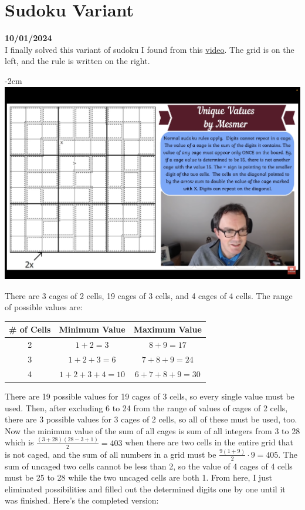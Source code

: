 \documentclass[12pt, oneside]{article}
\begin{document}
\section*{Sudoku Variant}
\textbf{10/01/2024}\\
I finally solved this variant of sudoku I found from this \href{https://www.youtube.com/watch?v=u0FhERdlWFc}{video}. The grid is on the left, and the rule is written on the right.
\begin{center}
\addtolength{\leftskip} {-2cm} %
\addtolength{\rightskip}{-2cm}
\includegraphics[scale=0.35]{puzzle2}
\end{center}
There are 3 cages of 2 cells, 19 cages of 3 cells, and 4 cages of 4 cells. The range of possible values are:
\begin{center}
\begin{tabular} {|c|c|c|}
\hline
\# of Cells & Minimum Value & Maximum Value\\
\hline
2 & $1+2=3$ & $8+9=17$\\
\hline
3 & $1+2+3=6$ & $7+8+9=24$\\
\hline
4 & $1+2+3+4=10$ & $6+7+8+9=30$\\
\hline
\end{tabular}
\end{center}
There are 19 possible values for 19 cages of 3 cells, so every single value must be used. Then, after excluding 6 to 24 from the range of values of cages of 2 cells, there are 3 possible values for 3 cages of 2 cells, so all of these must be used, too. Now the minimum value of the sum of all cages is sum of all integers from 3 to 28 which is $\frac{(3+28)(28-3+1)}{2} = 403$ when there are two cells in the entire grid that is not caged, and the sum of all numbers in a grid must be $\frac{9(1+9)}{2}\cdot9 = 405$. The sum of uncaged two cells cannot be less than 2, so the value of 4 cages of 4 cells must be 25 to 28 while the two uncaged cells are both 1. From here, I just eliminated possibilities and filled out the determined digits one by one until it was finished. Here's the completed version:
\end{document}
